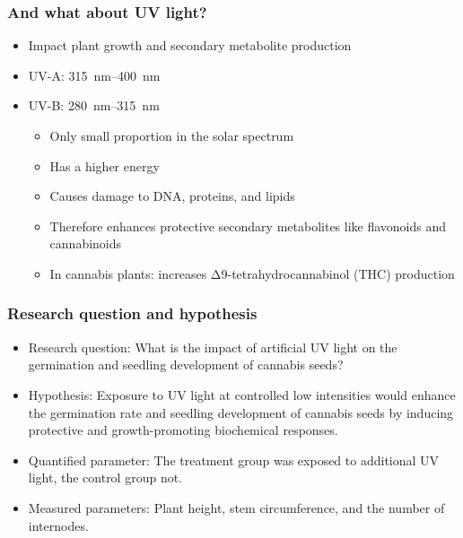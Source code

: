\documentclass[
    12pt,
    aspectratio=1610,
    bibliography=../bibliography.bib,
    link-citations]{beamer}
\begin{document}
    \begin{frame}
        \frametitle{And what about UV light?}
        \begin{itemize}
            \item Impact plant growth and secondary metabolite production
            \item UV-A: \qtyrange[mode=text, range-phrase=\textendash, range-units=single]{315}{400}{\nm}
            \item UV-B: \qtyrange[mode=text, range-phrase=\textendash, range-units=single]{280}{315}{\nm}
            \begin{itemize}
                \item Only small proportion in the solar spectrum
                \item Has a higher energy
                \item Causes damage to DNA, proteins, and lipids
                \item Therefore enhances protective secondary metabolites like flavonoids and cannabinoids
                \item In cannabis plants: increases Δ9-tetrahydrocannabinol (THC) production
            \end{itemize}
        \end{itemize}
        \quad \autocite{eichhorn_bilodeau_update_2019, international_organization_for_standardization_space_2007, lydon_uv-b_1987}
    \end{frame}

    \begin{frame}
        \frametitle{Research question and hypothesis}
        \begin{itemize}
            \item Research question: What is the impact of artificial UV light on the germination and seedling development of cannabis seeds?
            \item Hypothesis: Exposure to UV light at controlled low intensities would enhance the germination rate and seedling development of cannabis seeds by inducing protective and growth-promoting biochemical responses.
            \item Quantified parameter: The treatment group was exposed to additional UV light, the control group not.
            \item Measured parameters: Plant height, stem circumference, and the number of internodes.
        \end{itemize}
    \end{frame}
\end{document}
